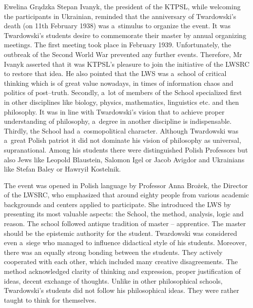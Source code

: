 \begin{editorialeng}{Ewelina Grądzka}
Stepan Ivanyk, the president of the KTPSL, while welcoming the participants in Ukrainian, reminded that the anniversary of Twardowski’s death (on 11th February 1938) was a~stimulus to organize the event. It was Twardowski’s students desire to commemorate their master by annual organizing meetings. The first meeting took place in February 1939. Unfortunately, the outbreak of the Second World War prevented any further events. Therefore, Mr Ivanyk asserted that it was KTPSL’s pleasure to join the initiative of the LWSRC to restore that idea. He also pointed that the LWS was a~school of critical thinking which is of great value nowadays, in times of information chaos and politics of post--truth. Secondly, a~lot of members of the School specialized first in other disciplines like biology, physics, mathematics, linguistics etc. and then philosophy. It was in line with Twardowski’s vision that to achieve proper understanding of philosophy, a~degree in another discipline is indispensable. Thirdly, the School had a~cosmopolitical character. Although Twardowski was a~great Polish patriot it did not dominate his vision of philosophy as universal, supranational. Among his students there were distinguished Polish Professors but also Jews like Leopold Blaustein, Salomon Igel or Jacob Avigdor and Ukrainians like Stefan Baley or Hawryił Kostelnik.

The event was opened in Polish language by Professor Anna Brożek, the Director of the LWSRC, who emphasized that around eighty people from various academic backgrounds and centers applied to participate. She introduced the LWS by presenting its most valuable aspects: the School, the method, analysis, logic and reason. The school followed antique tradition of master – apprentice. The master should be the epistemic authority for the student. Twardowski was considered even a~siege who managed to influence didactical style of his students. Moreover, there was an equally strong bonding between the students. They actively cooperated with each other, which included many creative disagreements. The method acknowledged clarity of thinking and expression, proper justification of ideas, decent exchange of thoughts. Unlike in other philosophical schools, Twardowski’s students did not follow his philosophical ideas. They were rather taught to think for themselves.


\end{editorialeng}
